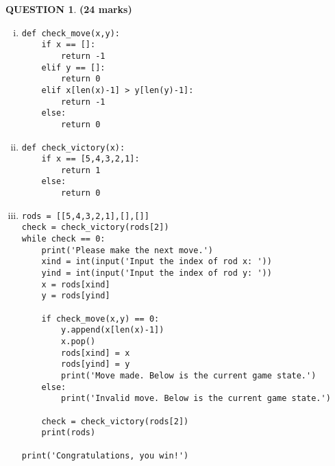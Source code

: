 \documentclass[a4paper,12pt]{article}
\theoremstyle{definition}
\newtheorem{ques}[dummy]{QUESTION}
\theoremstyle{plain}
\newcommand{\py}{python}
\begin{document}
	\begin{ques}\hfill\textbf{(24 marks)}\\
		\begin{enumerate}[(i)]
			\item 
			\begin{verbatim}
def check_move(x,y):
    if x == []:
        return -1
    elif y == []:
        return 0
    elif x[len(x)-1] > y[len(y)-1]:
        return -1
    else:
        return 0
			\end{verbatim}
			\item
			\begin{verbatim}
def check_victory(x):
    if x == [5,4,3,2,1]:
        return 1
    else:
        return 0
			\end{verbatim}
			
			\item 
			\begin{verbatim}
rods = [[5,4,3,2,1],[],[]]
check = check_victory(rods[2])
while check == 0:
    print('Please make the next move.')
    xind = int(input('Input the index of rod x: '))
    yind = int(input('Input the index of rod y: '))
    x = rods[xind]
    y = rods[yind]
    
    if check_move(x,y) == 0:
        y.append(x[len(x)-1])
        x.pop()
        rods[xind] = x
        rods[yind] = y
        print('Move made. Below is the current game state.')
    else:
        print('Invalid move. Below is the current game state.')
    
    check = check_victory(rods[2])
    print(rods)
    
print('Congratulations, you win!')
			\end{verbatim}
		\end{enumerate}
	\end{ques}
	
	
	
	
	
	
	
	
	
	
	
	
	
	
	
	
\end{document}
